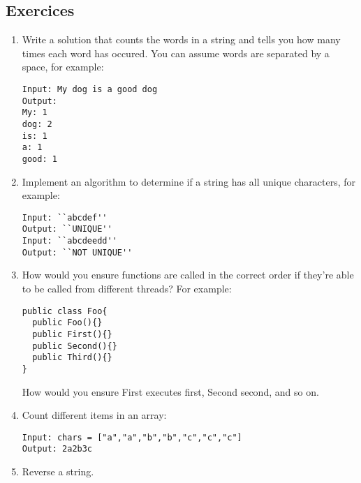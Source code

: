 \subsection{Exercices}
\begin{multicols}{2}

\begin{enumerate}
\item Write a solution that counts the words in a string and tells you how many times each word has occured. You can assume words are separated by a space, for example:
\begin{verbatim}
Input: My dog is a good dog
Output:
My: 1
dog: 2
is: 1
a: 1
good: 1
\end{verbatim}

\item Implement an algorithm to determine if a string has all unique characters, for example:
\begin{verbatim}
Input: ``abcdef''
Output: ``UNIQUE''
Input: ``abcdeedd''
Output: ``NOT UNIQUE''
\end{verbatim}

\item How would you ensure functions are called in the correct order if they're able to be called from different threads? For example:
\begin{verbatim}
public class Foo{
  public Foo(){}
  public First(){}
  public Second(){}
  public Third(){}
}
\end{verbatim}
How would you ensure First executes first, Second second, and so on.

\item Count different items in an array:
\begin{verbatim}
Input: chars = ["a","a","b","b","c","c","c"]
Output: 2a2b3c
\end{verbatim}

\item Reverse a string.
\end{enumerate}	
\end{multicols}
